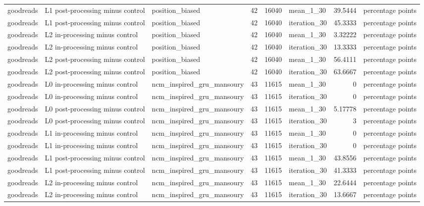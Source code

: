 \begin{table}[htbp!]
\begin{tabular}{lllrrlrl}
goodreads & L1 post-processing minus control & position\_biased & 42 & 16040 & mean\_1\_30 & 39.5444 & percentage points \\
goodreads & L1 post-processing minus control & position\_biased & 42 & 16040 & iteration\_30 & 45.3333 & percentage points \\
goodreads & L2 in-processing minus control & position\_biased & 42 & 16040 & mean\_1\_30 & 3.32222 & percentage points \\
goodreads & L2 in-processing minus control & position\_biased & 42 & 16040 & iteration\_30 & 13.3333 & percentage points \\
goodreads & L2 post-processing minus control & position\_biased & 42 & 16040 & mean\_1\_30 & 56.4111 & percentage points \\
goodreads & L2 post-processing minus control & position\_biased & 42 & 16040 & iteration\_30 & 63.6667 & percentage points \\
goodreads & L0 in-processing minus control & ncm\_inspired\_gru\_mansoury & 43 & 11615 & mean\_1\_30 & 0 & percentage points \\
goodreads & L0 in-processing minus control & ncm\_inspired\_gru\_mansoury & 43 & 11615 & iteration\_30 & 0 & percentage points \\
goodreads & L0 post-processing minus control & ncm\_inspired\_gru\_mansoury & 43 & 11615 & mean\_1\_30 & 5.17778 & percentage points \\
goodreads & L0 post-processing minus control & ncm\_inspired\_gru\_mansoury & 43 & 11615 & iteration\_30 & 3 & percentage points \\
goodreads & L1 in-processing minus control & ncm\_inspired\_gru\_mansoury & 43 & 11615 & mean\_1\_30 & 0 & percentage points \\
goodreads & L1 in-processing minus control & ncm\_inspired\_gru\_mansoury & 43 & 11615 & iteration\_30 & 0 & percentage points \\
goodreads & L1 post-processing minus control & ncm\_inspired\_gru\_mansoury & 43 & 11615 & mean\_1\_30 & 43.8556 & percentage points \\
goodreads & L1 post-processing minus control & ncm\_inspired\_gru\_mansoury & 43 & 11615 & iteration\_30 & 41.3333 & percentage points \\
goodreads & L2 in-processing minus control & ncm\_inspired\_gru\_mansoury & 43 & 11615 & mean\_1\_30 & 22.6444 & percentage points \\
goodreads & L2 in-processing minus control & ncm\_inspired\_gru\_mansoury & 43 & 11615 & iteration\_30 & 13.6667 & percentage points \\

\end{tabular}
\end{table}
